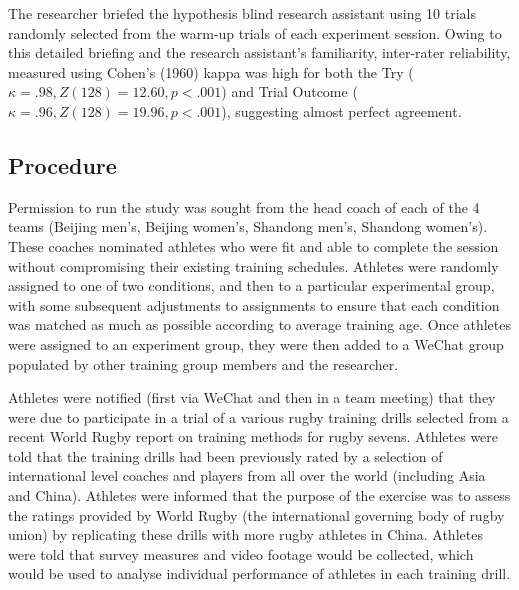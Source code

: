 \begin{CJK}{UTF8}{gbsn}
The researcher briefed the hypothesis blind research assistant using 10 trials randomly selected from the warm-up trials of each experiment session. Owing to this detailed briefing and the research assistant's familiarity, inter-rater reliability, measured using Cohen's (1960) kappa \citep[suitable for two coders, see][]{DiEugenio2004} was high for both the Try ($\kappa = .98, Z(128) = 12.60, p < .001$) and Trial Outcome ($\kappa = .96, Z(128) = 19.96, p < .001$), suggesting almost perfect agreement.

\subsection{Procedure}
Permission to run the study was sought from the head coach of each of the 4 teams (Beijing men's, Beijing women's, Shandong men's, Shandong women's).  These coaches nominated athletes who were fit and able to complete the session without compromising their existing training schedules.  Athletes were randomly assigned to one of two conditions, and then to a particular experimental group, with some subsequent adjustments to assignments to ensure that each condition was matched as much as possible according to average training age.  Once athletes were assigned to an experiment group, they were then added to a WeChat group populated by other training group members and the researcher.

Athletes were notified (first via WeChat and then in a team meeting) that they were due to participate in a trial of a various rugby training drills selected from a recent World Rugby report on training methods for rugby sevens.  Athletes were told that the training drills had been previously rated by a selection of international level coaches and players from all over the world (including Asia and China).  Athletes were informed that the purpose of the exercise was to assess the ratings provided by World Rugby (the international governing body of rugby union) by replicating these drills with more rugby athletes in China.  Athletes were told that survey measures and video footage would be collected, which would be used to analyse individual performance of athletes in each training drill.



\end{CJK}

